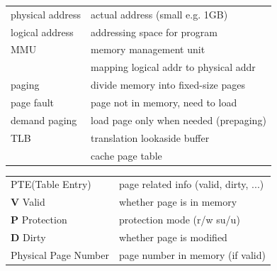 \documentclass[10pt]{article}
\begin{document}
\begin{multicols*}{2}
    \begin{tcolorbox}[title=Virtual Memory]
        \begin{tabular}{ll}
            physical address & actual address (small e.g. 1GB)        \\
            logical address  & addressing space for program           \\
            MMU              & memory management unit                 \\
            ~                & mapping logical addr to physical addr  \\
            paging           & divide memory into fixed-size pages    \\
            page fault       & page not in memory, need to load       \\
            demand paging    & load page only when needed (prepaging) \\
            TLB              & translation lookaside buffer           \\
            ~                & cache page table                       \\
            \hline
        \end{tabular}
        \begin{tabular}{ll}
            PTE(Table Entry)      & page related info (valid, dirty, ...) \\
            \textbf{V} Valid      & whether page is in memory             \\
            \textbf{P} Protection & protection mode (r/w su/u)            \\
            \textbf{D} Dirty      & whether page is modified              \\
            Physical Page Number  & page number in memory (if valid)      \\
        \end{tabular}
    \end{tcolorbox}


\end{multicols*}
\end{document}
